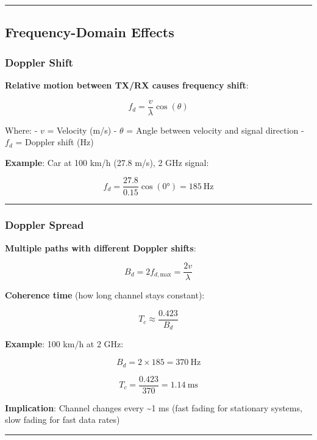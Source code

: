 \begin{center}\rule{0.5\linewidth}{0.5pt}\end{center}

\subsection{Frequency-Domain Effects}\label{frequency-domain-effects}

\subsubsection{Doppler Shift}\label{doppler-shift}

\textbf{Relative motion between TX/RX causes frequency shift}:

\[
f_d = \frac{v}{\lambda} \cos(\theta)
\]

Where: - \(v\) = Velocity (m/s) - \(\theta\) = Angle between velocity
and signal direction - \(f_d\) = Doppler shift (Hz)

\textbf{Example}: Car at 100 km/h (27.8 m/s), 2 GHz signal:

\[
f_d = \frac{27.8}{0.15} \cos(0°) = 185\ \text{Hz}
\]

\begin{center}\rule{0.5\linewidth}{0.5pt}\end{center}

\subsubsection{Doppler Spread}\label{doppler-spread}

\textbf{Multiple paths with different Doppler shifts}:

\[
B_d = 2f_{d,\text{max}} = \frac{2v}{\lambda}
\]

\textbf{Coherence time} (how long channel stays constant):

\[
T_c \approx \frac{0.423}{B_d}
\]

\textbf{Example}: 100 km/h at 2 GHz:

\[
B_d = 2 \times 185 = 370\ \text{Hz}
\]

\[
T_c = \frac{0.423}{370} = 1.14\ \text{ms}
\]

\textbf{Implication}: Channel changes every \textasciitilde1 ms (fast
fading for stationary systems, slow fading for fast data rates)

\begin{center}\rule{0.5\linewidth}{0.5pt}\end{center}


